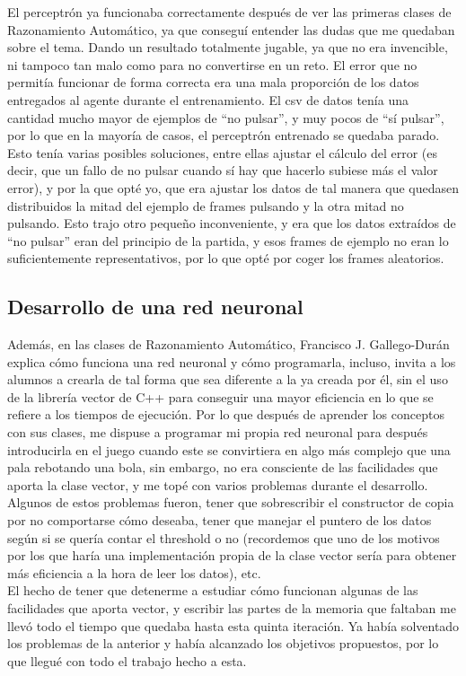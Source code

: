 El perceptrón ya funcionaba correctamente después de ver las primeras clases de Razonamiento Automático, ya que conseguí entender las dudas que me quedaban sobre el tema. Dando un resultado totalmente jugable, ya que no era invencible, ni tampoco tan malo como para no convertirse en un reto. El error que no permitía funcionar de forma correcta era una mala proporción de los datos entregados al agente durante el entrenamiento. El \gls{csv} de datos tenía una cantidad mucho mayor de ejemplos de ``no pulsar'', y muy pocos de ``sí pulsar'', por lo que en la mayoría de casos, el perceptrón entrenado se quedaba parado. Esto tenía varias posibles soluciones, entre ellas ajustar el cálculo del error (es decir, que un fallo de no pulsar cuando sí hay que hacerlo subiese más el valor error), y por la que opté yo, que era ajustar los datos de tal manera que quedasen distribuidos la mitad del ejemplo de frames pulsando y la otra mitad no pulsando. Esto trajo otro pequeño inconveniente, y era que los datos extraídos de ``no pulsar'' eran del principio de la partida, y esos frames de ejemplo no eran lo suficientemente representativos, por lo que opté por coger los frames aleatorios.

\subsection{Desarrollo de una red neuronal}
Además, en las clases de Razonamiento Automático, Francisco J. Gallego-Durán explica cómo funciona una red neuronal y cómo programarla, incluso, invita a los alumnos a crearla de tal forma que sea diferente a la ya creada por él, sin el uso de la librería vector de C++ para conseguir una mayor eficiencia en lo que se refiere a los tiempos de ejecución. Por lo que después de aprender los conceptos con sus clases, me dispuse a programar mi propia red neuronal para después introducirla en el juego cuando este se convirtiera en algo más complejo que una pala rebotando una bola, sin embargo, no era consciente de las facilidades que aporta la clase vector, y me topé con varios problemas durante el desarrollo.
\\
Algunos de estos problemas fueron, tener que sobrescribir el constructor de copia por no comportarse cómo deseaba, tener que manejar el puntero de los datos según si se quería contar el threshold o no (recordemos que uno de los motivos por los que haría una implementación propia de la clase vector sería para obtener más eficiencia a la hora de leer los datos), etc.
\\
El hecho de tener que detenerme a estudiar cómo funcionan algunas de las facilidades que aporta vector, y escribir las partes de la memoria que faltaban me llevó todo el tiempo que quedaba hasta esta quinta iteración. Ya había solventado los problemas de la anterior y había alcanzado los objetivos propuestos, por lo que llegué con todo el trabajo hecho a esta.


